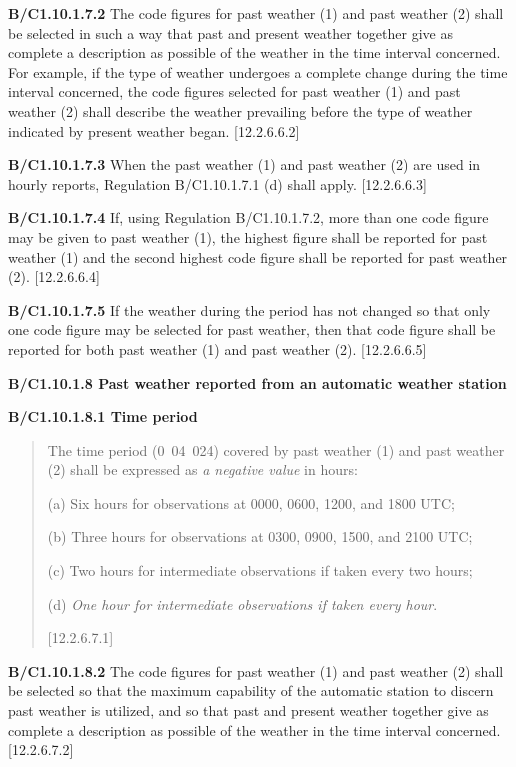 \textbf{B/C1.10.1.7.2} The code figures for past weather (1) and past weather (2) shall be selected in such a way that past and present weather together give as complete a description as possible of the weather in the time interval concerned. For example, if the type of weather undergoes a complete change during the time interval concerned, the code figures selected for past weather (1) and past weather (2) shall describe the weather prevailing before the type of weather indicated by present weather began. {[}12.2.6.6.2{]}

\textbf{B/C1.10.1.7.3} When the past weather (1) and past weather (2) are used in hourly reports, Regulation B/C1.10.1.7.1 (d) shall apply. {[}12.2.6.6.3{]}

\textbf{B/C1.10.1.7.4} If, using Regulation B/C1.10.1.7.2, more than one code figure may be given to past weather (1), the highest figure shall be reported for past weather (1) and the second highest code figure shall be reported for past weather (2). {[}12.2.6.6.4{]}

\textbf{B/C1.10.1.7.5} If the weather during the period has not changed so that only one code figure may be selected for past weather, then that code figure shall be reported for both past weather (1) and past weather (2). {[}12.2.6.6.5{]}

\textbf{B/C1.10.1.8 Past weather reported from an automatic weather station}

\textbf{B/C1.10.1.8.1 Time period}

\begin{quote}
The time period (0~04~024) covered by past weather (1) and past weather (2) shall be expressed as \emph{a negative value} in hours:

(a) Six hours for observations at 0000, 0600, 1200, and 1800 UTC;

(b) Three hours for observations at 0300, 0900, 1500, and 2100 UTC;

(c) Two hours for intermediate observations if taken every two hours;

(d) \emph{One hour for intermediate observations if taken every hour}.

{[}12.2.6.7.1{]}
\end{quote}

\textbf{B/C1.10.1.8.2} The code figures for past weather (1) and past weather (2) shall be selected so that the maximum capability of the automatic station to discern past weather is utilized, and so that past and present weather together give as complete a description as possible of the weather in the time interval concerned. {[}12.2.6.7.2{]}

